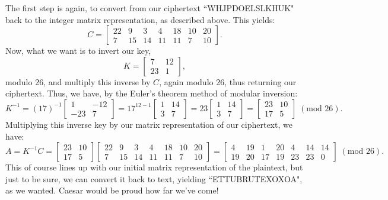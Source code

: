 \documentclass{article}
\begin{document}
\noindent The first step is again, to convert from our ciphertext ``WHJPDOELSLKHUK" back to the integer matrix representation, as described above. This yields:
\[
    C = \begin{bmatrix}
        22 & 9 & 3 & 4 & 18 & 10 & 20 \\
        7 & 15 & 14 & 11 & 11 & 7 & 10
    \end{bmatrix}.
\]
Now, what we want is to invert our key,
\[
    K = \begin{bmatrix}
        7 & 12 \\
        23 & 1
    \end{bmatrix},
\]
modulo 26, and multiply this inverse by $C$, again modulo 26, thus returning our ciphertext. Thus, we have, by the Euler's theorem method of modular inversion:
\[
    K^{-1} = (17)^{-1} \begin{bmatrix}
        1 & -12 \\
        -23 & 7
    \end{bmatrix} = 17^{12 - 1} \begin{bmatrix}
        1 & 14 \\
        3 & 7
    \end{bmatrix} = 23 \begin{bmatrix}
        1 & 14 \\
        3 & 7
    \end{bmatrix} = \begin{bmatrix}
        23 & 10 \\
        17 & 5
    \end{bmatrix} \; (\text{mod } 26).
\]
Multiplying this inverse key by our matrix representation of our ciphertext, we have:
\[
    A = K^{-1} C = \begin{bmatrix}
        23 & 10 \\
        17 & 5
    \end{bmatrix} \begin{bmatrix}
        22 & 9 & 3 & 4 & 18 & 10 & 20 \\
        7 & 15 & 14 & 11 & 11 & 7 & 10
    \end{bmatrix} = \begin{bmatrix}
        4 & 19 & 1 & 20 & 4 & 14 & 14 \\
        19 & 20 & 17 & 19 & 23 & 23 & 0
    \end{bmatrix} \; (\text{mod } 26).
\]
This of course lines up with our initial matrix representation of the plaintext, but just to be sure, we can convert it back to text, yielding ``ETTUBRUTEXOXOA", as we wanted. Caesar would be proud how far we've come!
\end{document}
